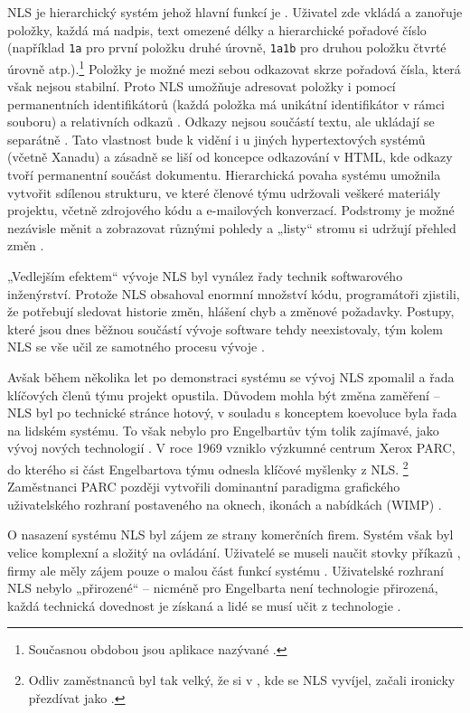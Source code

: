NLS je hierarchický systém jehož hlavní funkcí je . Uživatel zde vkládá a zanořuje položky, každá má nadpis, text omezené délky a hierarchické pořadové číslo (například \texttt{1a} pro první položku druhé úrovně, \texttt{1a1b} pro druhou položku čtvrté úrovně atp.).\footnote{Současnou obdobou jsou aplikace nazývané .}
Položky je možné mezi sebou odkazovat skrze pořadová čísla, která však nejsou stabilní. Proto NLS umožňuje adresovat položky i pomocí permanentních identifikátorů (každá položka má unikátní identifikátor v rámci souboru) a relativních odkazů \autocite[16--17]{Muller-Prove2002}. Odkazy nejsou součástí textu, ale ukládají se separátně \autocite[43]{Barnet2014}. Tato vlastnost bude k vidění i u jiných hypertextových systémů (včetně Xanadu) a zásadně se liší od koncepce odkazování v HTML, kde odkazy tvoří permanentní součást dokumentu.
Hierarchická povaha systému umožnila vytvořit sdílenou strukturu, ve které členové týmu udržovali veškeré materiály projektu, včetně zdrojového kódu a e-mailových konverzací. Podstromy je možné nezávisle měnit a zobrazovat různými pohledy a „listy“ stromu si udržují přehled změn \autocite[42]{Barnet2014}.

„Vedlejším efektem“ vývoje NLS byl vynález řady technik softwarového inženýrství. Protože NLS obsahoval enormní množství kódu, programátoři zjistili, že potřebují sledovat historie změn, hlášení chyb a změnové požadavky. Postupy, které jsou dnes běžnou součástí vývoje software tehdy neexistovaly, tým kolem NLS se vše učil ze samotného procesu vývoje \autocite[57--58]{Barnet2014}.

Avšak během několika let po demonstraci systému se vývoj NLS zpomalil a řada klíčových členů týmu projekt opustila. Důvodem mohla být změna zaměření -- NLS byl po technické stránce hotový, v souladu s konceptem koevoluce byla řada na lidském systému. To však nebylo pro Engelbartův tým tolik zajímavé, jako vývoj nových technologií \autocite[62]{Barnet2014}. V roce 1969 vzniklo výzkumné centrum Xerox PARC, do kterého si část Engelbartova týmu odnesla klíčové myšlenky z NLS.%
\footnote{Odliv zaměstnanců byl tak velký, že si v , kde se NLS vyvíjel, začali ironicky přezdívat jako  \autocite[202]{Markoff2005}.}
Zaměstnanci PARC později vytvořili dominantní paradigma grafického uživatelského rozhraní postaveného na oknech, ikonách a nabídkách (WIMP) \autocite[61]{Barnet2014}.

O nasazení systému NLS byl zájem ze strany komerčních firem. Systém však byl velice komplexní a složitý na ovládání. Uživatelé se museli naučit stovky příkazů \autocite[200]{Markoff2005}, firmy ale měly zájem pouze o malou část funkcí systému \autocite[62]{Barnet2014}. Uživatelské rozhraní NLS nebylo „přirozené“ -- nicméně pro Engelbarta není technologie přirozená, každá technická dovednost je získaná a lidé se musí učit z technologie \autocite[40]{Barnet2014}.


